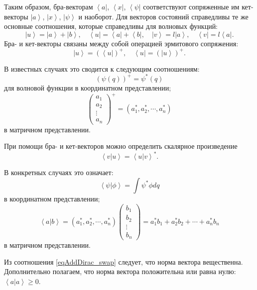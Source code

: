Таким образом, бра-векторам
$\left< a \right|$,  $\left< x \right|$, $\left< \psi \right|$
соответствуют сопряженные им кет-векторы  
$\left| a \right>$,  $\left| x \right>$, $\left| \psi \right>$
и наоборот. Для векторов состояний справедливы те же основные
соотношения, которые справедливы для волновых функций:  
\begin{equation}
\left| u \right> = \left| a \right>  + \left| b \right>, \quad 
\left< u \right| = \left< a \right|  + \left< b \right|, \quad 
\left| v \right> = l \left| a \right>, \quad  
\left< v \right| = l \left< a \right|.
\end{equation}
Бра- и кет-векторы связаны между собой операцией эрмитового 
сопряжения:
\begin{equation}
\left| u \right> = \left( \left< u \right| \right)^{+}, \quad 
\left< u \right| = \left( \left| u \right> \right)^{+}.
\end{equation}

В известных случаях это сводится к следующим соотношениям:
\[
\left( \psi\left( q \right) \right)^{+} = \psi^{*}\left( q \right)
\]
для волновой функции в координатном представлении;
\[
\left(
\begin{array} {c} 
a_1 \\
a_2 \\
\vdots \\
a_n
\end{array}
 \right)^{+} = 
\left( a_1^{*}, a_2^{*}, \cdots, a_n^{*}\right)
\]
в матричном представлении.

При помощи бра- и кет-векторов можно определить скалярное 
произведение
\begin{equation}
\left< v \right|\left. u \right> = \left< u \right|\left. v \right>^{*}.
\label{eqAddDirac_swap}
\end{equation}

В конкретных случаях это означает:
\[
\left< \psi \right|\left. \phi \right> = 
\int \psi^{*} \phi dq
\]
в координатном представлении;
\[
\left< a \right|\left. b \right> = 
\left( a_1^{*}, a_2^{*}, \cdots, a_n^{*}\right) 
\left(
\begin{array} {c} 
b_1 \\
b_2 \\
\vdots \\
b_n
\end{array}
 \right) = 
a_1^{*} b_1 +  a_2^{*} b_2 + \cdots + a_n^{*} b_n
\]
в матричном представлении.

Из соотношения \eqref{eqAddDirac_swap} следует, что норма вектора
вещественна. Дополнительно полагаем, что норма вектора положительна
или равна нулю: 
$\left< a \right|\left. a \right> \geq 0$.

